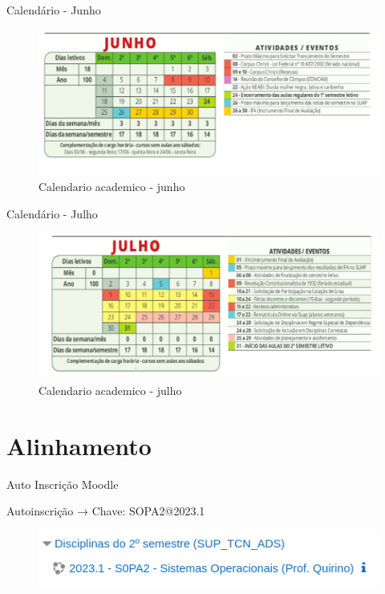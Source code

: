 \documentclass{beamer}
\begin{document}
\begin{frame}[fragile]{Calendário - Junho}
      \begin{figure}[H]
            \centerline{\includegraphics[width=1.1\textwidth]{assets/aula-tads-sopa2-2023-05-22/junho.png}}
            \caption{Calendario academico - junho}
        \end{figure}
\end{frame}

\begin{frame}[fragile]{Calendário - Julho}
      \begin{figure}[H]
            \centerline{\includegraphics[width=1.1\textwidth]{assets/aula-tads-sopa2-2023-05-22/julho.png}}
            \caption{Calendario academico - julho}
        \end{figure}
\end{frame}

\section{Alinhamento}

\begin{frame}[fragile]{Auto Inscrição Moodle}

      Autoinscrição → Chave: SOPA2@2023.1

      \begin{figure}[H]
            \centerline{\includegraphics[width=1\textwidth]{assets/aula-tads-sopa2-2023-05-22/moodle.png}}
            
        \end{figure}
\end{frame}
\end{document}
